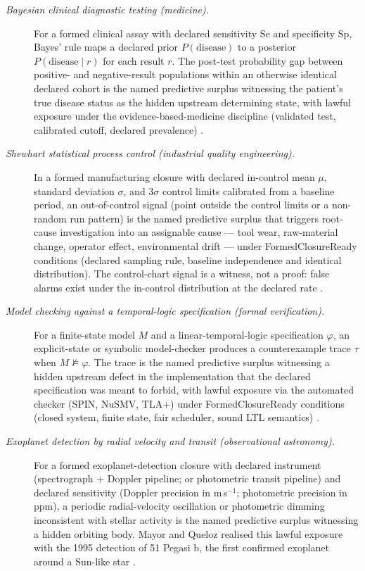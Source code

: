 \documentclass[11pt]{article}
\theoremstyle{definition}
\begin{document}
\begin{description}
\item[\emph{Bayesian clinical diagnostic testing (medicine).}]
For a formed clinical assay with declared sensitivity \(\mathrm{Se}\)
and specificity \(\mathrm{Sp}\), Bayes' rule maps a declared prior
\(P(\text{disease})\) to a posterior \(P(\text{disease}\mid r)\) for
each result \(r\).  The post-test probability gap between
positive- and negative-result populations within an otherwise
identical declared cohort is the named predictive surplus
witnessing the patient's true disease status as the hidden upstream
determining state, with lawful exposure under the
evidence-based-medicine discipline (validated test, calibrated
cutoff, declared prevalence)
\citep{Sackett2000EvidenceBasedMedicine}.

\item[\emph{Shewhart statistical process control (industrial
quality engineering).}]
In a formed manufacturing closure with declared in-control mean
\(\mu\), standard deviation \(\sigma\), and \(3\sigma\) control
limits calibrated from a baseline period, an out-of-control signal
(point outside the control limits or a non-random run pattern) is
the named predictive surplus that triggers root-cause investigation
into an assignable cause --- tool wear, raw-material change,
operator effect, environmental drift --- under FormedClosureReady
conditions (declared sampling rule, baseline independence and
identical distribution).  The control-chart signal is a witness, not
a proof: false alarms exist under the in-control distribution at the
declared rate
\citep{Shewhart1931EconomicControl}.

\item[\emph{Model checking against a temporal-logic specification
(formal verification).}]
For a finite-state model \(M\) and a linear-temporal-logic
specification \(\varphi\), an explicit-state or symbolic
model-checker produces a counterexample trace \(\tau\) when
\(M\not\models\varphi\).  The trace is the named predictive surplus
witnessing a hidden upstream defect in the implementation that the
declared specification was meant to forbid, with lawful exposure via
the automated checker (SPIN, NuSMV, TLA+) under FormedClosureReady
conditions (closed system, finite state, fair scheduler, sound LTL
semantics)
\citep{ClarkeEmersonSistla1986AutomaticVerification}.

\item[\emph{Exoplanet detection by radial velocity and transit
(observational astronomy).}]
For a formed exoplanet-detection closure with declared instrument
(spectrograph + Doppler pipeline; or photometric transit pipeline)
and declared sensitivity (Doppler precision in m\,s\(^{-1}\);
photometric precision in ppm), a periodic radial-velocity
oscillation or photometric dimming inconsistent with stellar
activity is the named predictive surplus witnessing a hidden
orbiting body.  Mayor and Queloz realised this lawful exposure with
the 1995 detection of 51 Pegasi b, the first confirmed exoplanet
around a Sun-like star
\citep{MayorQueloz199551Pegasi}.


\end{description}
\end{document}
